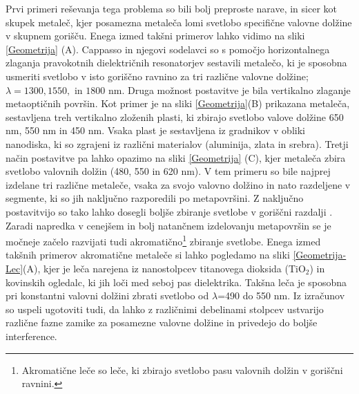 \documentclass[12pt ]{article}
\begin{document}
 Prvi primeri reševanja tega problema so bili bolj preproste narave, in sicer kot skupek metaleč, kjer posamezna metaleča lomi svetlobo specifične valovne dolžine v skupnem gorišču. Enega izmed takšni primerov lahko vidimo na sliki \ref{Geometrija} (A).  Cappasso in njegovi sodelavci \cite{Metaleče_opis} so s pomočjo horizontalnega zlaganja pravokotnih dielektričnih resonatorjev sestavili metalečo, ki je sposobna usmeriti svetlobo v isto goriščno ravnino za tri različne valovne dolžine; $\lambda= 1300, 1550, $ in $1800$ nm. Druga možnost postavitve je bila vertikalno zlaganje metaoptičnih površin. Kot primer je na sliki \ref{Geometrija}(B) prikazana metaleča, sestavljena treh vertikalno zloženih plasti, ki zbirajo svetlobo valove dolžine 650 nm, 550 nm in 450 nm. Vsaka plast je sestavljena iz gradnikov v obliki nanodiska, ki so zgrajeni iz različni materialov (aluminija, zlata in srebra). Tretji način postavitve pa lahko opazimo na sliki \ref{Geometrija} (C), kjer metaleča zbira svetlobo valovnih dolžin (480, 550 in 620 nm). V tem primeru so bile najprej izdelane tri različne metaleče, vsaka za svojo valovno dolžino in nato razdeljene v segmente, ki so jih naključno razporedili po metapovršini. Z naključno postavitvijo so tako lahko dosegli boljše zbiranje svetlobe v goriščni razdalji \cite{Metaleče_opis}.\\
 
 Zaradi napredka v cenejšem in bolj natančnem izdelovanju metapovršin se je močneje začelo razvijati tudi akromatično\footnote{Akromatične leče so leče, ki zbirajo svetlobo pasu valovnih dolžin v goriščni ravnini.} zbiranje svetlobe. Enega izmed takšnih primerov akromatične metaleče si lahko pogledamo na sliki \ref{Geometrija-Lec}(A), kjer je leča narejena iz nanostolpcev titanovega dioksida (TiO$_2$) in kovinskih ogledalc, ki jih loči med seboj pas dielektrika. Takšna leča je sposobna pri konstantni valovni dolžini zbrati svetlobo od $\lambda$=490 do 550 nm. Iz izračunov so uspeli ugotoviti tudi, da lahko z različnimi debelinami stolpcev ustvarijo različne fazne zamike za posamezne valovne dolžine in privedejo do boljše interference.
 
\end{document}
